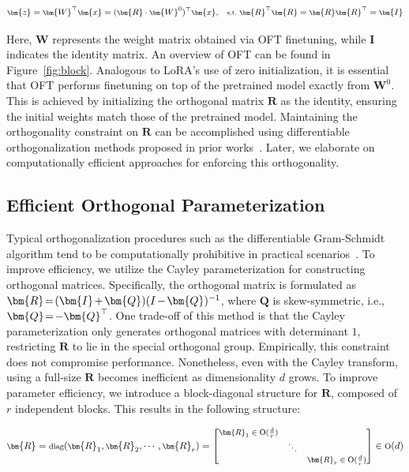 \begin{equation}\label{eq:oft_general}
    \footnotesize
    \bm{z}=\bm{W}^\top\bm{x}=(\bm{R}\cdot\bm{W}^0)^\top\bm{x},~~~\text{s.t.}~\bm{R}^\top\bm{R}=\bm{R}\bm{R}^\top=\bm{I}
\end{equation}

Here, $\bm{W}$ represents the weight matrix obtained via OFT finetuning, while $\bm{I}$ indicates the identity matrix. An overview of OFT can be found in Figure~\ref{fig:block}. Analogous to LoRA’s use of zero initialization, it is essential that OFT performs finetuning on top of the pretrained model exactly from $\bm{W}^0$. This is achieved by initializing the orthogonal matrix $\bm{R}$ as the identity, ensuring the initial weights match those of the pretrained model. Maintaining the orthogonality constraint on $\bm{R}$ can be accomplished using differentiable orthogonalization methods proposed in prior works~\cite{liu2021orthogonal,lezcano2019cheap}. Later, we elaborate on computationally efficient approaches for enforcing this orthogonality.

\subsection{Efficient Orthogonal Parameterization}\label{sect:eff_ortho}

Typical orthogonalization procedures such as the differentiable Gram-Schmidt algorithm tend to be computationally prohibitive in practical scenarios~\cite{liu2021orthogonal}. To improve efficiency, we utilize the Cayley parameterization for constructing orthogonal matrices. Specifically, the orthogonal matrix is formulated as $\thickmuskip=2mu \medmuskip=2mu \bm{R}=(\bm{I}+\bm{Q})(I-\bm{Q})^{-1}$, where $\bm{Q}$ is skew-symmetric, i.e., $\thickmuskip=2mu \medmuskip=2mu \bm{Q}=-\bm{Q}^\top$. One trade-off of this method is that the Cayley parameterization only generates orthogonal matrices with determinant $1$, restricting $\bm{R}$ to lie in the special orthogonal group. Empirically, this constraint does not compromise performance. Nonetheless, even with the Cayley transform, using a full-size $\bm{R}$ becomes inefficient as dimensionality $d$ grows. To improve parameter efficiency, we introduce a block-diagonal structure for $\bm{R}$, composed of $r$ independent blocks. This results in the following structure:

\begin{equation}
    \footnotesize
    \bm{R}=\text{diag}(\bm{R}_1,\bm{R}_2,\cdots,\bm{R}_r)=\begin{bmatrix}
    \bm{R}_1\in \text{O}(\frac{d}{r}) &  &\\
    &\ddots & \\
    & & \bm{R}_r\in \text{O}(\frac{d}{r})
    \end{bmatrix}\in \text{O}(d)
\end{equation}

